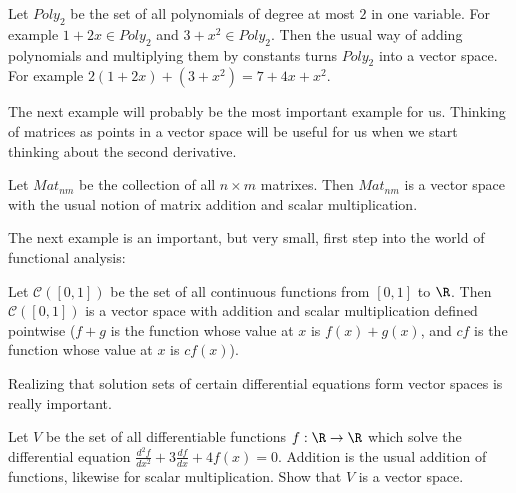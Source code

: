 \documentclass{ximera}
\begin{document}
		\begin{example}
		Let $Poly_2$ be the set of all polynomials of degree at most $2$ in one variable.  For example $1+2x \in Poly_2$ and $3+x^2 \in Poly_2$.  Then the usual way of 
		adding polynomials and multiplying them by constants turns $Poly_2$ into a vector space.  For example $2(1+2x)+(3+x^2)  = 7+4x+x^2$.
		\end{example}
		
	
	The next example will probably be the most important example for us.  Thinking of matrices as points in a vector space will be useful for us when we 
	start thinking about the second derivative.
	
	\begin{example}
		Let $Mat_{nm}$ be the collection of all $n \times m$ matrixes.  Then $Mat_{nm}$ is a vector space with the usual notion of matrix addition and scalar multiplication.
	\end{example}
	
	The next example is an important, but very small, first step into the world of functional analysis:
	
	\begin{example}
		Let $\mathcal{C}([0,1])$ be the set of all continuous functions from $[0,1]$ to $\R$.  Then $\mathcal{C}([0,1])$ is a vector space with addition and scalar 
		multiplication defined pointwise ($f+g$ is the function whose value at $x$ is $f(x)+g(x)$, and $cf$ is the function whose value at $x$ is $cf(x)$).
	\end{example}
	
	Realizing that solution sets of certain differential equations form vector spaces is really important.  
	

		Let $V$ be the set of all differentiable functions $f: \R \to \R$ which solve the differential equation $\frac{d^2f}{dx^2} + 3\frac{df}{dx} +4f(x) = 0$.
		Addition is the usual addition of functions, likewise for scalar multiplication.  Show that $V$ is a vector space.
		
\end{document}
